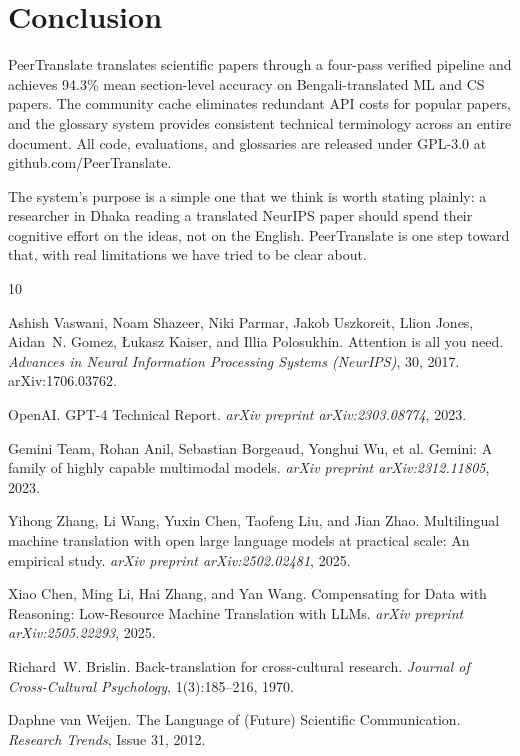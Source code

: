 \documentclass{article}
\begin{document}
\section{Conclusion}

PeerTranslate translates scientific papers through a four-pass verified pipeline and achieves 94.3\% mean section-level accuracy on Bengali-translated ML and CS papers. The community cache eliminates redundant API costs for popular papers, and the glossary system provides consistent technical terminology across an entire document. All code, evaluations, and glossaries are released under GPL-3.0 at github.com/PeerTranslate.

The system's purpose is a simple one that we think is worth stating plainly: a researcher in Dhaka reading a translated NeurIPS paper should spend their cognitive effort on the ideas, not on the English. PeerTranslate is one step toward that, with real limitations we have tried to be clear about.

\begin{thebibliography}{10}

Ashish Vaswani, Noam Shazeer, Niki Parmar, Jakob Uszkoreit, Llion Jones, Aidan~N. Gomez, {\L}ukasz Kaiser, and Illia Polosukhin.
\newblock Attention is all you need.
\newblock \emph{Advances in Neural Information Processing Systems (NeurIPS)}, 30, 2017.
\newblock arXiv:1706.03762.

OpenAI.
\newblock GPT-4 Technical Report.
\newblock \emph{arXiv preprint arXiv:2303.08774}, 2023.

Gemini Team, Rohan Anil, Sebastian Borgeaud, Yonghui Wu, et al.
\newblock Gemini: A family of highly capable multimodal models.
\newblock \emph{arXiv preprint arXiv:2312.11805}, 2023.

Yihong Zhang, Li Wang, Yuxin Chen, Taofeng Liu, and Jian Zhao.
\newblock Multilingual machine translation with open large language models at practical scale: An empirical study.
\newblock \emph{arXiv preprint arXiv:2502.02481}, 2025.

Xiao Chen, Ming Li, Hai Zhang, and Yan Wang.
\newblock Compensating for Data with Reasoning: Low-Resource Machine Translation with LLMs.
\newblock \emph{arXiv preprint arXiv:2505.22293}, 2025.

Richard~W. Brislin.
\newblock Back-translation for cross-cultural research.
\newblock \emph{Journal of Cross-Cultural Psychology}, 1(3):185--216, 1970.

Daphne van Weijen.
\newblock The Language of (Future) Scientific Communication.
\newblock \emph{Research Trends}, Issue 31, 2012.

\end{thebibliography}
\end{document}
